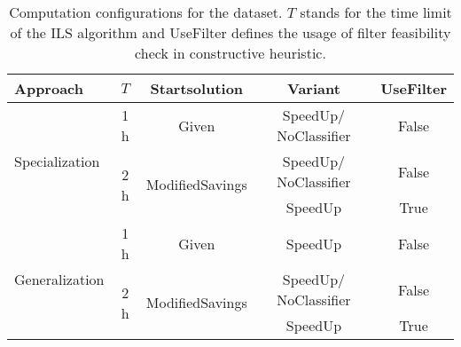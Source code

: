 \begin{table}[ht]
    \centering
    \small
    \begin{tabular}{l c c c c }
        \toprule
        Approach                        & $T$                  & Startsolution                    & Variant               & UseFilter \\
        \midrule
        \multirow{3}{*}{Specialization} & 1 h                  & Given                            & SpeedUp/ NoClassifier & False     \\\cmidrule(lr){2-5}
                                        & \multirow{2}{*}{2 h} & \multirow{2}{*}{ModifiedSavings} & SpeedUp/ NoClassifier & False     \\
                                        &                      &                                  & SpeedUp               & True      \\ \midrule
        \multirow{3}{*}{Generalization} & 1 h                  & Given                            & SpeedUp               & False     \\\cmidrule(lr){2-5}
                                        & \multirow{2}{*}{2 h} & \multirow{2}{*}{ModifiedSavings} & SpeedUp/ NoClassifier & False     \\
                                        &                      &                                  & SpeedUp               & True      \\
        \bottomrule
    \end{tabular}
    \caption[Computation configurations for the \krebsADataSetText dataset.]{Computation configurations for the \krebsADataSetText dataset. $T$ stands for the time limit of the ILS algorithm
        and UseFilter defines the usage of filter feasibility check in constructive heuristic.}
    \label{tab:condigurations_krebs_results}
\end{table}

